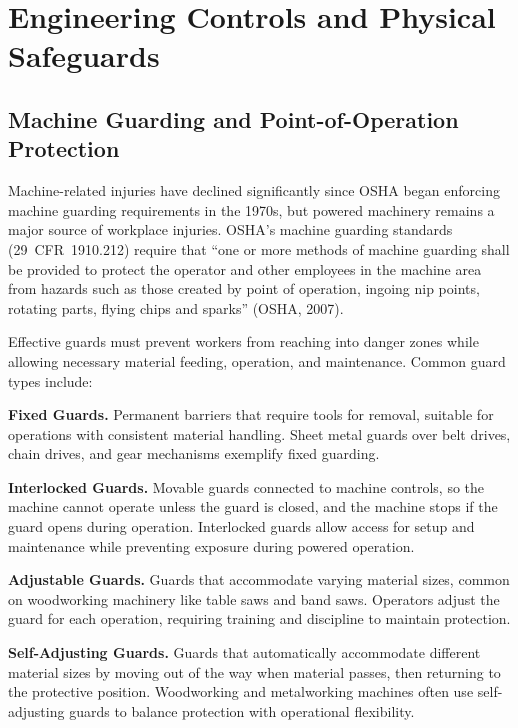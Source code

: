 \documentclass[11pt,openany]{book}
\begin{document}
\section{Engineering Controls and Physical Safeguards}
\label{sec:engineering-controls}

\subsection{Machine Guarding and Point-of-Operation Protection}

Machine-related injuries have declined significantly since OSHA began
enforcing machine guarding requirements in the 1970s, but powered machinery
remains a major source of workplace injuries. OSHA's machine guarding
standards (29~CFR~1910.212) require that ``one or more methods of machine
guarding shall be provided to protect the operator and other employees in the
machine area from hazards such as those created by point of operation, ingoing
nip points, rotating parts, flying chips and sparks'' (OSHA, 2007).

Effective guards must prevent workers from reaching into danger zones while
allowing necessary material feeding, operation, and maintenance. Common guard
types include:

\textbf{Fixed Guards.} Permanent barriers that require tools for removal,
suitable for operations with consistent material handling. Sheet metal guards
over belt drives, chain drives, and gear mechanisms exemplify fixed guarding.

\textbf{Interlocked Guards.} Movable guards connected to machine controls, so
the machine cannot operate unless the guard is closed, and the machine stops
if the guard opens during operation. Interlocked guards allow access for setup
and maintenance while preventing exposure during powered operation.

\textbf{Adjustable Guards.} Guards that accommodate varying material sizes,
common on woodworking machinery like table saws and band saws. Operators
adjust the guard for each operation, requiring training and discipline to
maintain protection.

\textbf{Self-Adjusting Guards.} Guards that automatically accommodate
different material sizes by moving out of the way when material passes, then
returning to the protective position. Woodworking and metalworking machines
often use self-adjusting guards to balance protection with operational
flexibility.
\end{document}
